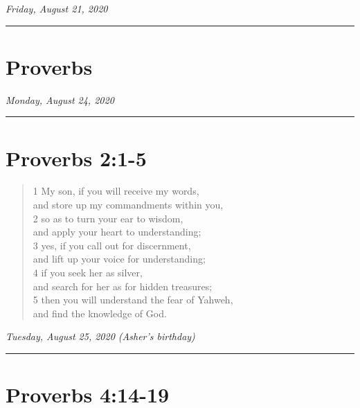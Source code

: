 \documentclass[
]{book}
\begin{document}
\emph{Friday, August 21, 2020}

\begin{center}\rule{0.5\linewidth}{0.5pt}\end{center}

\hypertarget{proverbs}{%
\section{Proverbs}\label{proverbs}}

\emph{Monday, August 24, 2020}

\begin{center}\rule{0.5\linewidth}{0.5pt}\end{center}

\hypertarget{proverbs-21-5}{%
\section{Proverbs 2:1-5}\label{proverbs-21-5}}

\begin{quote}
1 My son, if you will receive my words,\\
and store up my commandments within you,\\
2 so as to turn your ear to wisdom,\\
and apply your heart to understanding;\\
3 yes, if you call out for discernment,\\
and lift up your voice for understanding;\\
4 if you seek her as silver,\\
and search for her as for hidden treasures;\\
5 then you will understand the fear of Yahweh,\\
and find the knowledge of God.
\end{quote}

\emph{Tuesday, August 25, 2020 (Asher's birthday)}

\begin{center}\rule{0.5\linewidth}{0.5pt}\end{center}

\hypertarget{proverbs-414-19}{%
\section{Proverbs 4:14-19}\label{proverbs-414-19}}
\end{document}

